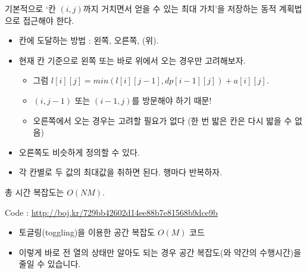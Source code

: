 \documentclass[hyperref={unicode}]{beamer}
\begin{document}
 
    \begin{frame}
         기본적으로 `칸 $ (i, j) $까지 거치면서 얻을 수 있는 최대 가치'을 저장하는 동적 계획법으로 접근해야 한다.
        \begin{itemize}
            \item<2-> 칸에 도달하는 방법 : 왼쪽, 오른쪽, (위).
            \item<3-> 현재 칸 기준으로 왼쪽 또는 바로 위에서 오는 경우만 고려해보자.
            \begin{itemize}
                \item<4-> 그럼 $ l[i][j] = min(l[i][j-1], dp[i-1][j]) + a[i][j] $.
                \item<5-> $ (i, j-1) $ 또는 $ (i-1, j) $를 방문해야 하기 때문!
                \item<5-> 오른쪽에서 오는 경우는 고려할 필요가 없다 {\minigray(한 번 밟은 칸은 다시 밟을 수 없음)}
            \end{itemize}
            \item<6-> 오른쪽도 비슷하게 정의할 수 있다.
            \item<7-> 각 칸별로 두 값의 최대값을 취하면 된다. 행마다 반복하자.
        \end{itemize}
         총 시간 복잡도는 $ O(NM) $.
    \end{frame}
    
    \begin{frame}
        Code : \url{http://boj.kr/729bb42602d14ee88b7e81568b9dce9b}
        \begin{itemize}
            \item 토글링(toggling)을 이용한 공간 복잡도 $ O(M) $ 코드
            \item 이렇게 바로 전 열의 상태만 알아도 되는 경우 공간 복잡도(와 약간의 수행시간)을 줄일 수 있습니다.
        \end{itemize}
    \end{frame}
\end{document}
